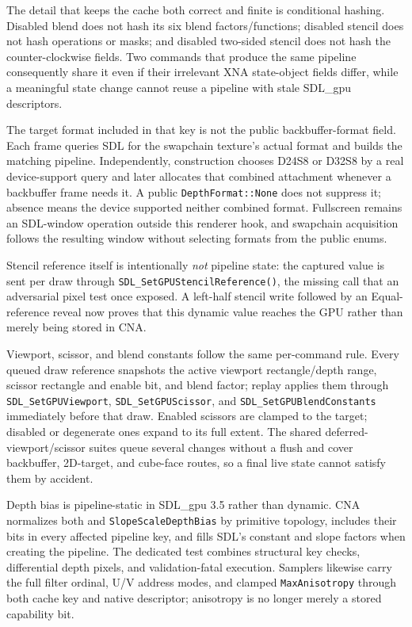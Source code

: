 The detail that keeps the cache both correct and finite is conditional hashing. Disabled blend
does not hash its six blend factors/functions; disabled stencil does not hash operations or masks;
and disabled two-sided stencil does not hash the counter-clockwise fields. Two commands that
produce the same pipeline consequently share it even if their irrelevant XNA state-object fields
differ, while a meaningful state change cannot reuse a pipeline with stale SDL\_gpu descriptors.

\begin{sourcenote}
The target format included in that key is not the public backbuffer-format field. Each frame
queries SDL for the swapchain texture's actual format and builds the matching pipeline.
Independently, construction chooses D24S8 or D32S8 by a real device-support query and later allocates that
combined attachment whenever a backbuffer frame needs it. A public
\texttt{DepthFormat::None} does not suppress it; absence means the device supported neither
combined format. Fullscreen remains an SDL-window operation outside this renderer hook, and
swapchain acquisition follows the resulting window without selecting formats from the public
enums.
\end{sourcenote}
Stencil reference itself is intentionally \emph{not} pipeline state: the captured value is sent
per draw through \texttt{SDL\_SetGPUStencilReference()}, the missing call that an adversarial
pixel test once exposed. A left-half stencil write followed by an Equal-reference reveal now
proves that this dynamic value reaches the GPU rather than merely being stored in CNA.

Viewport, scissor, and blend constants follow the same per-command rule. Every queued draw
reference snapshots the active viewport rectangle/depth range, scissor rectangle and enable bit,
and blend factor; replay applies them through \texttt{SDL\_SetGPUViewport},
\texttt{SDL\_SetGPUScissor}, and \texttt{SDL\_SetGPUBlendConstants} immediately before that
draw. Enabled scissors are clamped to the target; disabled or degenerate ones expand to its full
extent. The shared deferred-viewport/scissor suites queue several changes without a flush and
cover backbuffer, 2D-target, and cube-face routes, so a final live state cannot satisfy them by
accident.

Depth bias is pipeline-static in SDL\_gpu 3.5 rather than dynamic. CNA normalizes both
 and \texttt{SlopeScaleDepthBias} by primitive topology,
includes their bits in every affected pipeline key, and fills SDL's constant and slope factors
when creating the pipeline. The dedicated test combines structural key checks, differential
depth pixels, and validation-fatal execution. Samplers likewise carry the full filter ordinal,
U/V address modes, and clamped \texttt{MaxAnisotropy} through both cache key and native
descriptor; anisotropy is no longer merely a stored capability bit.

